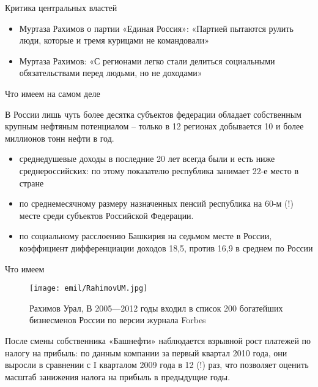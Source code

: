 \begin{frame}{Критика центральных властей}

\begin{itemize}
	\item Муртаза Рахимов о партии «Единая Россия»: «Партией пытаются рулить люди, которые и тремя курицами не командовали»
	\item Муртаза Рахимов: «С регионами легко стали делиться социальными обязательствами перед людьми, но не доходами»
\end{itemize}

\end{frame}

\begin{frame}{Что имеем на самом деле}

В России лишь чуть более десятка субъектов федерации обладает собственным крупным нефтяным потенциалом – только в 12 регионах добывается 10 и более миллионов тонн нефти в год.

\begin{itemize}
	\item среднедушевые доходы в последние 20 лет всегда были и есть ниже среднероссийских: по этому показателю республика занимает 22-е место в стране
	\item  по среднемесячному размеру назначенных пенсий республика на 60-м (!) месте среди субъектов Российской Федерации.
	\item по социальному расслоению Башкирия на седьмом месте в России, коэффициент дифференциации доходов 18,5, против 16,9 в среднем по России
\end{itemize}

\end{frame}

\begin{frame}{Что имеем}

\begin{figure}[h!]
	\begin{center}
		{\texttt{[image: emil/RahimovUM.jpg]}}
		\caption{Рахимов Урал, В 2005—2012 годы входил в список 200 богатейших бизнесменов России по версии журнала Forbes}
	\end{center}
\end{figure}

После смены собственника «Башнефти» наблюдается взрывной рост платежей по налогу на прибыль: по данным компании за первый квартал 2010 года, они выросли в сравнении с I кварталом 2009 года в 12 (!) раз, что позволяет оценить масштаб занижения налога на прибыль в предыдущие годы. 
\end{frame}

